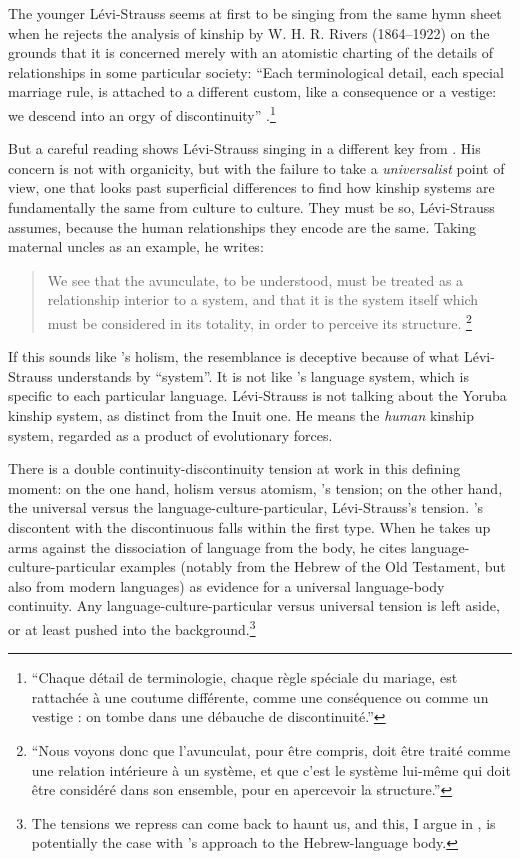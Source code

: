 \documentclass[output=paper]{langscibook}
\begin{document}
The younger Lévi-Strauss seems at first to be singing from the same hymn sheet when he rejects the analysis of kinship by W. H. R. Rivers (1864--1922) on the grounds that it is concerned merely with an atomistic charting of the details of relationships in some particular society: ``Each terminological detail, each special marriage rule, is attached to a different custom, like a consequence or a vestige: we descend into an orgy of discontinuity'' \citep[37]{LeviStrauss1945}.\footnote{``Chaque détail de terminologie, chaque règle spéciale du mariage, est rattachée à une coutume différente, comme une conséquence ou comme un vestige : on tombe dans une débauche de discontinuité.''}

But a careful reading shows Lévi-Strauss singing in a different key from {\Cassirer}. His concern is not with organicity, but with the failure to take a \emph{universalist} point of view, one that looks past superficial differences to find how kinship systems are fundamentally the same from culture to culture. They must be so, Lévi-Strauss assumes, because the human relationships they encode are the same. Taking maternal uncles as an example, he writes:

\begin{quotation}
We see that the avunculate, to be understood, must be treated as a relationship interior to a system, and that it is the system itself which must be considered in its totality, in order to perceive its structure. \citep[47]{LeviStrauss1945}\footnote{``Nous voyons donc que l'avunculat, pour être compris, doit être traité comme une relation intérieure à un système, et que c'est le système lui-même qui doit être considéré dans son ensemble, pour en apercevoir la structure.''}
\end{quotation}

If this sounds like {\Cassirer}'s holism, the resemblance is deceptive because of what Lévi-Strauss understands by ``system''. It is not like {\Saussure}'s language system, which is specific to each particular language. Lévi-Strauss is not talking about the Yoruba kinship system, as distinct from the Inuit one. He means the \emph{human} kinship system, regarded as a product of evolutionary forces.

There is a double continuity-discontinuity tension at work in this defining  moment: on the one hand, holism versus atomism, {\Cassirer}'s tension; on the other hand, the universal versus the language-culture-particular, Lévi-Strauss's tension. {\Meschonnic}'s discontent with the discontinuous falls with\-in the first type. When he takes up arms against the  dissociation of language from the body, he cites language-culture-particular examples (notably from the Hebrew of the Old Testament, but also from modern languages) as evidence for a universal language-body continuity. Any language-culture-particular versus universal tension is left aside, or at least pushed into the background.\footnote{The tensions we repress can come back to haunt us, and this, I argue in \citet{Joseph2018languagebody}, is potentially the case with {\Meschonnic}'s approach to the Hebrew-language body.} 
\end{document}
